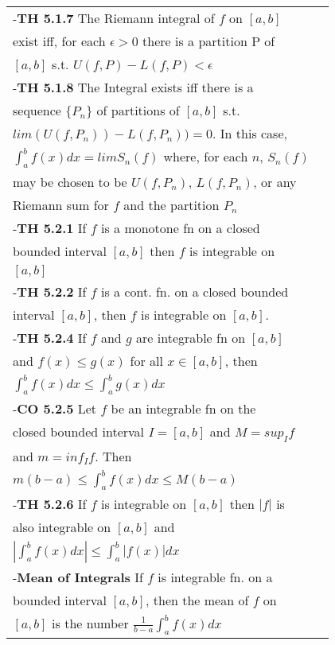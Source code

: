 \documentclass[10 pt,landscape]{article}
\begin{document}
\begin{multicols}{4}
\begin{tabular}{@{}ll@{}}


-\textbf{TH 5.1.7} The Riemann integral of $f$ on $[a,b]$\\ exist iff, for each $\epsilon >0$ there is a partition P of \\ $[a,b]$ s.t. $U(f,P)-L(f,P)< \epsilon $\\
-\textbf{TH 5.1.8} The Integral exists iff there is a\\ sequence $\{P_n\}$ of partitions of $[a,b]$ s.t.\\ $lim(U(f,P_n))-L(f,P_n))=0$. In this case,\\
$\int_{a}^{b}f(x)dx=limS_n(f)$ where, for each $n$, $S_n(f)$\\ may be chosen to be $U(f,P_n)$, $L(f,P_n)$, or any \\Riemann sum for $f$ and the partition $P_n$\\
-\textbf{TH 5.2.1} If $f$ is a monotone fn on a closed\\ bounded interval $[a,b]$ then $f$ is integrable on\\ $[a,b]$\\
-\textbf{TH 5.2.2} If $f$ is a cont. fn. on a closed bounded \\interval $[a,b]$, then $f$ is integrable on $[a,b]$. \\
-\textbf{TH 5.2.4} If $f$ and $g$ are integrable fn on $[a,b]$\\ and $f(x) \leq g(x)$ for all $x \in [a,b]$, then\\ $\int_{a}^{b}f(x)dx \leq \int_{a}^{b}g(x)dx$\\
-\textbf{CO 5.2.5} Let $f$ be an integrable fn on the \\ closed bounded interval $I=[a,b]$ and $M=sup_I f$\\ and $m=inf_I f$. Then \\$m(b-a) \leq \int_{a}^{b}f(x)dx \leq M(b-a)$\\
-\textbf{TH 5.2.6} If $f$ is integrable on $[a,b]$ then $|f|$ is \\ also integrable on $[a,b]$ and \\
$|\int_{a}^{b}f(x)dx| \leq \int_{a}^{b}|f(x)|dx$\\
-\textbf{Mean of Integrals} If $f$ is integrable fn. on a \\ bounded interval $[a,b]$, then the mean of $f$ on \\$[a,b]$ is the number $\frac{1}{b-a}\int_{a}^{b}f(x)dx$\\


\end{tabular}
\end{multicols}
\end{document}
